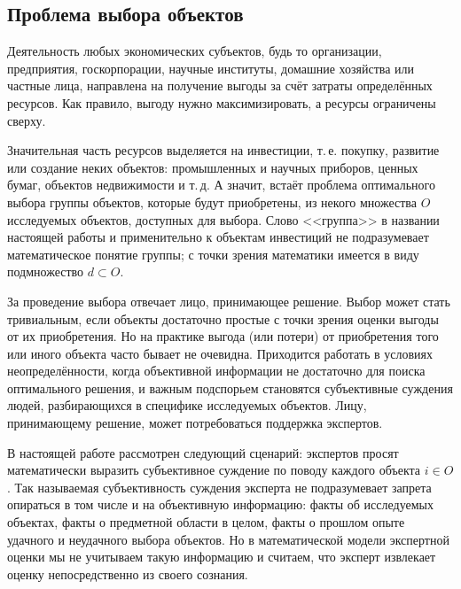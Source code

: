 
\subsection{Проблема выбора объектов}

Деятельность любых экономических субъектов, будь то организации, предприятия, госкорпорации, научные институты, домашние хозяйства или частные лица, направлена на получение выгоды за счёт затраты определённых ресурсов. Как правило, выгоду нужно максимизировать, а ресурсы ограничены сверху. 

Значительная часть ресурсов выделяется на инвестиции, т.\,е. покупку, развитие или создание неких объектов: промышленных и научных приборов, ценных бумаг, объектов недвижимости и т.\,д. А значит, встаёт проблема оптимального выбора группы объектов, которые будут приобретены, из некого множества $O$ исследуемых объектов, доступных для выбора. Слово <<группа>> в названии настоящей работы и применительно к объектам инвестиций не подразумевает  математическое понятие группы; с точки зрения математики имеется в виду подмножество $d \subset O$. 

За проведение выбора отвечает лицо, принимающее решение. Выбор может стать тривиальным, если объекты достаточно простые с точки зрения оценки выгоды от их приобретения. Но на практике выгода (или потери) от приобретения того или иного объекта часто бывает не очевидна. Приходится работать в условиях неопределённости, когда объективной информации не достаточно для поиска оптимального решения, и важным подспорьем становятся субъективные суждения людей, разбирающихся в специфике исследуемых объектов. Лицу, принимающему решение, может потребоваться поддержка экспертов. 

В настоящей работе рассмотрен следующий сценарий: экспертов просят математически выразить субъективное суждение по поводу каждого объекта $i \in O$. Так называемая субъективность суждения эксперта не подразумевает запрета опираться в том числе и на объективную информацию: факты об исследуемых объектах, факты о предметной области в целом, факты о прошлом опыте удачного и неудачного выбора объектов. Но в математической модели экспертной оценки мы не учитываем такую информацию и считаем, что эксперт извлекает оценку непосредственно из своего сознания. 

